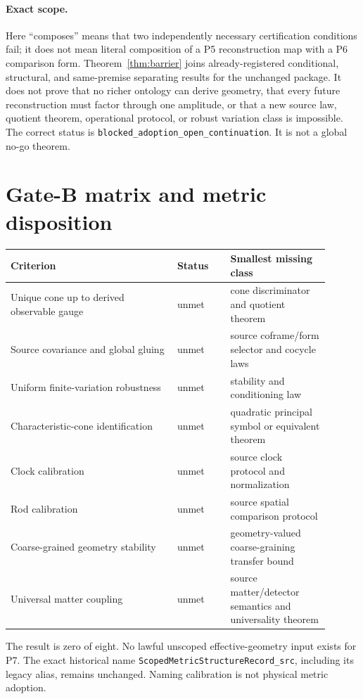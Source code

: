 \documentclass[11pt]{article}
\begin{document}
\paragraph{Exact scope.}
Here ``composes'' means that two independently necessary certification
conditions fail; it does not mean literal composition of a P5 reconstruction
map with a P6 comparison form.  Theorem~\ref{thm:barrier} joins
already-registered conditional, structural, and same-premise separating
results for the unchanged package.  It does not prove that no
richer ontology can derive geometry, that every future reconstruction must
factor through one amplitude, or that a new source law, quotient theorem,
operational protocol, or robust variation class is impossible.  The correct
status is \texttt{blocked\_adoption\_open\_continuation}.
It is not a global no-go theorem.

\section{Gate-B matrix and metric disposition}

\begin{center}
\begin{tabular}{p{0.47\linewidth}p{0.15\linewidth}p{0.28\linewidth}}
\toprule
Criterion & Status & Smallest missing class \\
\midrule
Unique cone up to derived observable gauge & unmet & cone discriminator and quotient theorem \\
Source covariance and global gluing & unmet & source coframe/form selector and cocycle laws \\
Uniform finite-variation robustness & unmet & stability and conditioning law \\
Characteristic-cone identification & unmet & quadratic principal symbol or equivalent theorem \\
Clock calibration & unmet & source clock protocol and normalization \\
Rod calibration & unmet & source spatial comparison protocol \\
Coarse-grained geometry stability & unmet & geometry-valued coarse-graining transfer bound \\
Universal matter coupling & unmet & source matter/detector semantics and universality theorem \\
\bottomrule
\end{tabular}
\end{center}

The result is zero of eight.  No lawful unscoped effective-geometry input
exists for P7.  The exact historical name
\texttt{ScopedMetricStructureRecord\_src}, including its legacy alias, remains
unchanged.  Naming calibration is not physical metric adoption.
\end{document}
